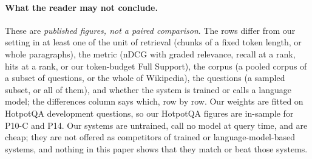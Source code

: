 \paragraph{What the reader may not conclude.} These are \emph{published figures, not a paired
comparison}. The rows differ from our setting in at least one of the unit of retrieval
(chunks of a fixed token length, or whole paragraphs), the metric (nDCG with graded relevance, recall at
a rank, hits at a rank, or our token-budget Full Support), the corpus (a pooled
corpus of a subset of questions, or the whole of Wikipedia), the questions (a sampled subset, or all of
them), and whether the system is trained or calls a language model; the differences column says which,
row by row. Our weights are fitted on HotpotQA development questions, so our HotpotQA figures are
in-sample for P10-C and P14. Our systems are untrained, call no model at query time, and are
cheap; they are not offered as competitors of trained or language-model-based systems, and
nothing in this paper shows that they match or beat those systems.
